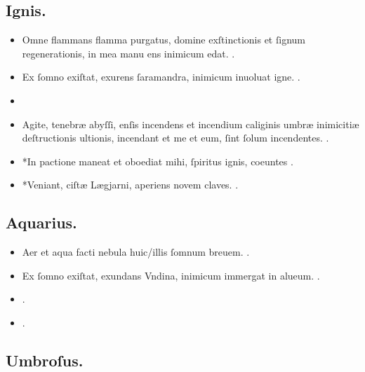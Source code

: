 \documentclass[12pt]{book}
\newcommand{\reconst}{*}
\begin{document}
\subsection{Ignis.}\label{ignis}

\begin{itemize}
  \item Omne flammans flamma purgatus,
        domine exſtinctionis et ſignum regenerationis,
        in mea manu ens inimicum edat.
        .
  \item Ex ſomno exiſtat, exurens ſaramandra, inimicum inuoluat igne.
        .
  \item {}
  \item Agite, tenebræ abyſſi, enſis incendens et incendium
        caliginis umbræ inimicitiæ deſtructionis ultionis,
        incendant et me et eum, ſint ſolum incendentes.
        .
  \item \reconst{}In pactione maneat et oboediat mihi, ſpiritus ignis, coeuntes \textelp{}
        .
  \item \reconst{}Veniant, ciſtæ Lægjarni, aperiens novem claves.
        .
\end{itemize}

\subsection{Aquarius.}\label{aquarius}

\begin{itemize}
  \item Aer et aqua facti nebula huic/illis ſomnum breuem. .
  \item Ex ſomno exiſtat, exundans Vndina, inimicum immergat in alueum. .
  \item {}.
  \item {}.
\end{itemize}

\subsection{Umbroſus.}\label{umbrosus}
\end{document}
